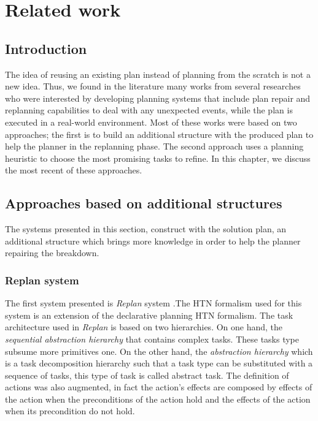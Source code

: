 \chapter{Related work} %

\label{Chapter 3} 


\section{Introduction}
\par The idea of reusing an existing plan instead of planning from the scratch is not a new idea. Thus, we found in the literature many works from several researches who were interested by developing planning systems that include plan repair and replanning capabilities to deal with any unexpected events, while the plan is executed in a real-world environment. Most of these works were based on two approaches; the first is to build an additional structure with the produced plan to help the planner in the replanning phase. The second approach uses a planning heuristic to choose the most promising tasks to refine. 
In this chapter, we discuss the most recent of these approaches. 

\section{Approaches based on additional structures}
 The systems presented in this section, construct with the solution plan, an additional structure which brings more knowledge in order to help the planner repairing the breakdown. 
 
\subsection{Replan system}
\par The first system presented is \textit{Replan} system \cite{boella2002replanning}.The HTN formalism used for this system is an extension of the declarative planning HTN formalism.
The task architecture used in \textit{Replan} is based on two hierarchies. On one hand, the \textit{sequential abstraction hierarchy} that contains complex tasks. These tasks type subsume more primitives one. On the other hand, the\textit{ abstraction hierarchy }which is a task decomposition hierarchy such that a task type can be substituted with a sequence of tasks, this type of task is called abstract task. The definition of actions was also augmented, in fact the action’s effects are composed by effects of the action when the preconditions of the action hold and the effects of the action when its precondition do not hold. 

